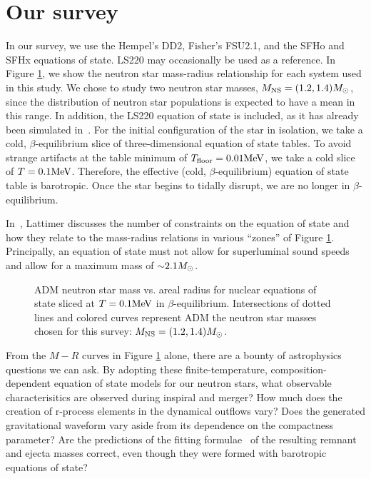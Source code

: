 \section{Our survey}

In our survey, we use the Hempel's DD2, Fisher's FSU2.1, and the SFHo and SFHx equations of state.  
LS220 may occasionally be used as a reference. 
In Figure \ref{fig:MvsR}, we show the neutron star mass-radius relationship for each system used in this study. 
We chose to study two neutron star masses, $M_{\rm NS} = (1.2, 1.4) M_{\odot}$, since the distribution of neutron star populations is expected to have a mean in this range. 
In addition, the LS220 equation of state is included, as it has already been simulated in~\cite{Foucart:2014nda}.  
For the initial configuration of the star in isolation, we take a cold, $\beta$-equilibrium slice of three-dimensional equation of state tables.  
To avoid strange artifacts at the table minimum of $T_{\rm floor} = 0.01 {\rm MeV}$, we take a cold slice of  $T = 0.1 {\rm MeV}$.  Therefore, the effective (cold, $\beta$-equilibrium) equation of state table is barotropic. Once the star begins to tidally disrupt, we are no longer in $\beta$-equilibrium.

In~\cite{lattimer2016equation}, Lattimer discusses the number of constraints on the equation of state and how they relate to the mass-radius relations in various ``zones'' of Figure \ref{fig:MvsR}.  
Principally, an equation of state must not allow for superluminal sound speeds and allow for a maximum mass of $\mathord{\sim} 2.1 M_{\odot}$.

\begin{figure}
	\centering
	
	\caption[Neutron star mass vs. areal radius]{
		ADM neutron star mass vs. areal radius for nuclear equations of state sliced at $T=0.1{\rm MeV}$ in $\beta$-equilibrium.  Intersections of dotted lines and colored curves represent ADM the neutron star masses chosen for this survey: $M_{\rm NS} = (1.2, 1.4) M_{\odot}$.  
	}
	\label{fig:MvsR}
\end{figure}

From the $M-R$ curves in Figure \ref{fig:MvsR} alone, there are a bounty of astrophysics questions we can ask.  
By adopting these finite-temperature, composition-dependent equation of state models for our neutron stars, what observable characterisitics are observed during inspiral and merger?  
How much does the creation of r-process elements in the dynamical outflows vary?  
Does the generated gravitational waveform vary aside from its dependence on the compactness parameter?  
Are the predictions of the fitting formulae~\cite{foucart2012black,pannarale2014black,kawaguchi2016models} of the resulting remnant and ejecta masses correct, even though they were formed with barotropic equations of state?

